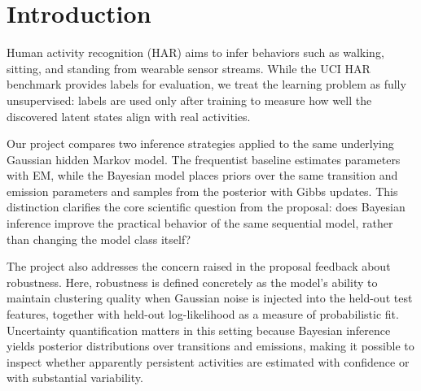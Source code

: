 \section{Introduction}
Human activity recognition (HAR) aims to infer behaviors such as walking, sitting, and standing from wearable sensor streams. While the UCI HAR benchmark provides labels for evaluation, we treat the learning problem as fully unsupervised: labels are used only after training to measure how well the discovered latent states align with real activities.

Our project compares two inference strategies applied to the same underlying Gaussian hidden Markov model. The frequentist baseline estimates parameters with EM, while the Bayesian model places priors over the same transition and emission parameters and samples from the posterior with Gibbs updates. This distinction clarifies the core scientific question from the proposal: does Bayesian inference improve the practical behavior of the same sequential model, rather than changing the model class itself?

The project also addresses the concern raised in the proposal feedback about robustness. Here, robustness is defined concretely as the model's ability to maintain clustering quality when Gaussian noise is injected into the held-out test features, together with held-out log-likelihood as a measure of probabilistic fit. Uncertainty quantification matters in this setting because Bayesian inference yields posterior distributions over transitions and emissions, making it possible to inspect whether apparently persistent activities are estimated with confidence or with substantial variability.
